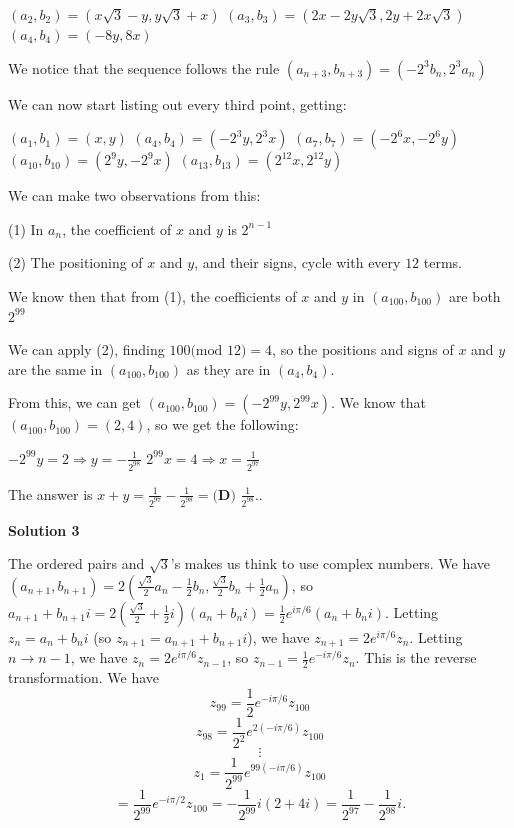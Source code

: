 \begin{enumerate}
 


 $(a_2,b_2)=(x\sqrt{3}-y,y\sqrt{3}+x)$
$(a_3,b_3)=(2x-2y\sqrt{3},2y+2x\sqrt{3})$
$(a_4,b_4)=(-8y,8x)$

 


 We notice that the sequence follows the rule $(a_{n+3},b_{n+3})=(-2^3b_n,2^3a_n)$

 We can now start listing out every third point, getting:

 


 $(a_1,b_1)=(x,y)$
$(a_4,b_4)=(-2^3y,2^3x)$
$(a_7,b_7)=(-2^6x,-2^6y)$
$(a_{10},b_{10})=(2^9y,-2^9x)$
$(a_{13},b_{13})=(2^{12}x,2^{12}y)$

 


 We can make two observations from this: 

 (1) In $a_n$, the coefficient of $x$ and $y$ is $2^{n-1}$

 (2) The positioning of $x$ and $y$, and their signs, cycle with every $12$ terms.

 


 We know then that from (1), the coefficients of $x$ and $y$ in $(a_{100},b_{100})$ are both $2^{99}$

 We can apply (2), finding $100 \text{(mod }12)=4$, so the positions and signs of $x$ and $y$ are the same in $(a_{100},b_{100})$ as they are in $(a_{4},b_{4})$.

 From this, we can get $(a_{100},b_{100})=(-2^{99}y,2^{99}x)$. We know that $(a_{100},b_{100})=(2,4)$, so we get the following:

 


 $-2^{99}y=2 \Rightarrow y=-\frac{1}{2^{98}}$
$2^{99}x=4 \Rightarrow x=\frac{1}{2^{97}}$

 


 The answer is $x+y=\frac{1}{2^{97}}-\frac{1}{2^{98}}=\boxed{\textbf{(D) }\frac{1}{2^{98}}}$..

 



\textbf{Solution 3}

The ordered pairs and $\sqrt{3}$'s makes us think to use complex numbers. We have $(a_{n+1},b_{n+1}) = 2\left(\frac{\sqrt{3}}{2}a_n - \frac{1}{2}b_n, \frac{\sqrt{3}}{2}b_n + \frac{1}{2}a_n\right)$, so $a_{n+1} + b_{n+1}i = 2\left(\frac{\sqrt{3}}{2} + \frac{1}{2}i\right)(a_n + b_ni) = \frac{1}{2}e^{i\pi/6}(a_n + b_ni)$. Letting $z_n = a_n + b_ni$ (so $z_{n+1} = a_{n+1} + b_{n+1}i$), we have $z_{n+1} = 2e^{i\pi/6}z_n$. Letting $n\rightarrow n-1$, we have $z_n = 2e^{i\pi/6}z_{n-1}$, so $z_{n-1} = \frac{1}{2}e^{-i\pi/6}z_n$. This is the reverse transformation. We have
 \[z_{99} = \frac{1}{2}e^{-i\pi/6}z_{100}\]
 \[z_{98} = \frac{1}{2^2}e^{2(-i\pi/6)}z_{100}\]
 \[\vdots\]
 \[z_{1} = \frac{1}{2^{99}}e^{99(-i\pi/6)}z_{100}\]
 \[= \frac{1}{2^{99}}e^{-i\pi/2}z_{100} = -\frac{1}{2^{99}}i(2 + 4i) = \frac{1}{2^{97}} - \frac{1}{2^{98}}i.\]


\end{enumerate}
